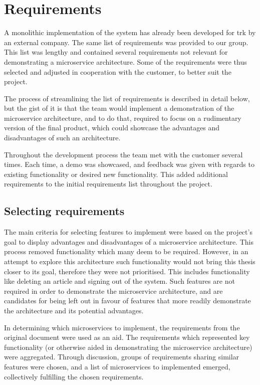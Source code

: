 \chapter{Requirements}
\label{chapterRequirement} \label{chapter:requirements}

A monolithic implementation of the system has already been developed for \acrshort{trk} by an external company. 
The same list of requirements was provided to our group. This list was lengthy and contained several requirements not relevant for demonstrating a microservice architecture. Some of the requirements were thus selected and adjusted in cooperation with the customer, to better suit the project.

The process of streamlining the list of requirements is described in detail below, but the gist of it is that the team would implement a demonstration of the microservice architecture, and to do that, required to focus on a rudimentary version of the final product, which could showcase the advantages and disadvantages of such an architecture.

Throughout the development process the team met with the customer several times. Each time, a demo was showcased, and feedback was given with regards to existing functionality or desired new functionality. This added additional requirements to the initial requirements list throughout the project.

\section{Selecting requirements}
The main criteria for selecting features to implement were based on the project's goal to display advantages and disadvantages of a microservice architecture. This process removed functionality which many deem to be required. However, in an attempt to explore this architecture such functionality would not bring this thesis closer to its goal, therefore they were not prioritised. This includes functionality like deleting an article and signing out of the system. Such features are not required in order to demonstrate the microservice architecture, and are candidates for being left out in favour of features that more readily demonstrate the architecture and its potential advantages.
 
In determining which microservices to implement, the requirements from the original document were used as an aid. The requirements which represented key functionality (or otherwise aided in demonstrating the microservice architecture) were aggregated. Through discussion, groups of requirements sharing similar features were chosen, and a list of microservices to implemented emerged, collectively fulfilling the chosen requirements.

